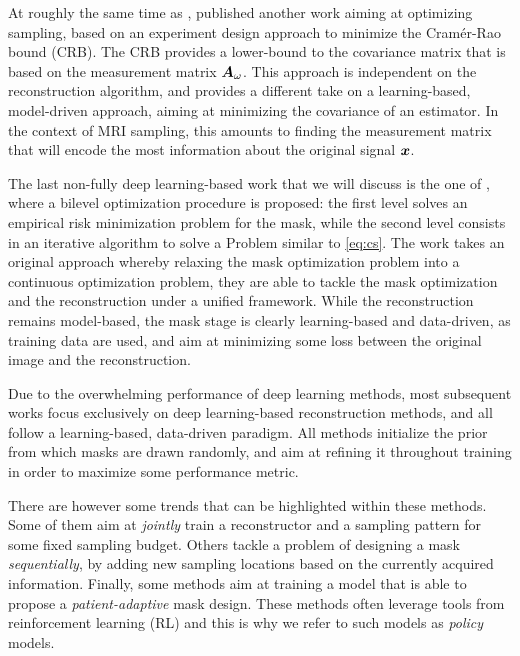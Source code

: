 At roughly the same time as \citet{gozcu2018learning}, \citet{haldar2019oedipus} published another work aiming at optimizing sampling, based on an experiment design approach to minimize the Cramér-Rao bound (CRB). The CRB provides a lower-bound to the covariance matrix that is based on the measurement matrix ${\bm{A}}_\omega$. This approach is independent on the reconstruction algorithm, and provides a different take on a learning-based, model-driven approach, aiming at minimizing the covariance of an estimator. In the context of MRI sampling, this amounts to finding the measurement matrix that will encode the most information about the original signal ${\bm{x}}$. 

The last non-fully deep learning-based work that we will discuss is the one of \citet{sherry2019learning}, where a bilevel optimization procedure is proposed: the first level solves an empirical risk minimization problem for the mask, while the second level consists in an iterative algorithm to solve a Problem similar to \ref{eq:cs}. The work takes an original approach whereby relaxing the mask optimization problem into a continuous optimization problem, they are able to tackle the mask optimization and the reconstruction under a unified framework. While the reconstruction remains model-based, the mask stage is clearly learning-based and data-driven, as training data are used, and aim at minimizing some loss between the original image and the reconstruction.

Due to the overwhelming performance of deep learning methods, most subsequent works focus exclusively on deep learning-based reconstruction methods, and all follow  a learning-based, data-driven paradigm. All methods initialize the prior from which masks are drawn randomly, and aim at refining it throughout training in order to maximize some performance metric. 

There are however some trends that can be highlighted within these methods. Some of them aim at \textit{jointly} train a reconstructor and a sampling pattern for some fixed sampling budget. Others tackle a problem of designing a mask \textit{sequentially}, by adding new sampling locations based on the currently acquired information. Finally, some methods aim at training a model that is able to propose a \textit{patient-adaptive} mask design. These methods often leverage tools from reinforcement learning (RL) and this is why we refer to such models as \textit{policy} models. 

